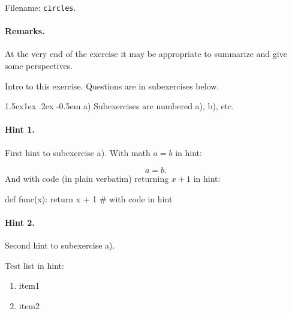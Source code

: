 \documentclass[%
oneside,                 %
final,                   %
10pt]{article}
\makeatletter
\newenvironment{doconceexercise}{}{}
\newcounter{doconceexercisecounter}
\newcommand\subex{\@startsection{paragraph}{4}{\z@}%
                  {1.5ex\@plus1ex \@minus.2ex}%
                  {-0.5em}%
                  {\normalfont\normalsize\bfseries}}
\theoremstyle{definition}
\makeatother
\begin{document}
\begin{enumerate}
\begin{doconceexercise}
\noindent Filename: \texttt{circles}.


\paragraph{Remarks.}
At the very end of the exercise it may be appropriate to summarize
and give some perspectives.

\end{doconceexercise}

\begin{doconceexercise}

                             
\label{exer:dist}

Intro to this exercise. Questions are in subexercises below.


\subex{a)}
Subexercises are numbered a), b), etc.


\paragraph{Hint 1.}
First hint to subexercise a).
With math $a=b$ in hint:

\[ a=b. \]
And with code (in plain verbatim) returning $x+1$ in hint:

\bccq
def func(x):
    return x + 1  # with code in hint
\eccq



\paragraph{Hint 2.}
Second hint to subexercise a).

Test list in hint:

\begin{enumerate}
\item item1

\item item2
\end{enumerate}


\end{doconceexercise}
\end{enumerate}
\end{document}
